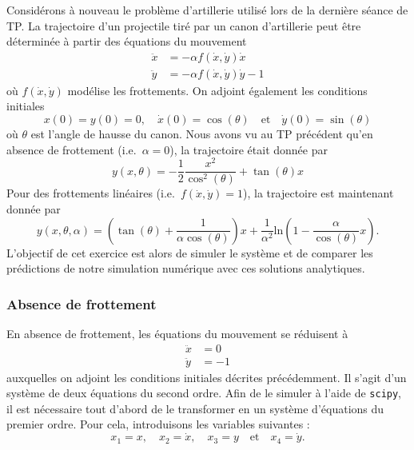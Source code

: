\documentclass[a4paper,12pt]{article} %
\begin{document}
Considérons à nouveau le problème d'artillerie utilisé lors de la dernière séance de TP.
La trajectoire d'un projectile tiré par un canon d'artillerie peut être déterminée à partir des équations du mouvement
%
\[
\begin{aligned}
  \ddot{x} & = -\alpha f(\dot{x}, \dot{y})\dot{x}\\
  \ddot{y} & = -\alpha f(\dot{x}, \dot{y}) \dot{y} - 1
\end{aligned}
\]
%
où $f(\dot{x}, \dot{y})$ modélise les frottements.
On adjoint également les conditions initiales
%
\[
x(0) = y(0) = 0, \quad \dot{x}(0) = \cos(\theta) \quad \text{et} \quad \dot{y}(0) = \sin(\theta)
\]
%
où $\theta$ est l'angle de hausse du canon.
Nous avons vu au TP précédent qu'en absence de frottement (i.e.\ $\alpha = 0$), la trajectoire était donnée par
%
\[
y(x, \theta) = -\dfrac{1}{2} \dfrac{x^2}{\cos^2(\theta)} + \tan(\theta)x
\]
%
Pour des frottements linéaires (i.e.\ $f(\dot{x}, \dot{y}) = 1$), la trajectoire est maintenant donnée par
%
\[
y(x, \theta, \alpha) = \left( \tan(\theta) + \dfrac{1}{\alpha \cos(\theta)} \right) x + \dfrac{1}{\alpha^2} \mathrm{ln} \left( 1 - \dfrac{\alpha}{\cos(\theta)}x \right).
\]
%
L'objectif de cet exercice est alors de simuler le système et de comparer les prédictions de notre simulation numérique avec ces solutions analytiques.

\subsubsection*{Absence de frottement}

En absence de frottement, les équations du mouvement se réduisent à
%
\[
\begin{aligned}
  \ddot{x} & = 0 \\
  \ddot{y} & = -1
\end{aligned}
\]
%
auxquelles on adjoint les conditions initiales décrites précédemment.
Il s'agit d'un système de deux équations du second ordre.
Afin de le simuler à l'aide de \verb+scipy+, il est nécessaire tout d'abord de le transformer en un système d'équations du premier ordre.
Pour cela, introduisons les variables suivantes :
%
\[
x_1 = x, \quad x_2 = \dot{x}, \quad x_3 = y \quad \text{et} \quad x_4 = \dot{y}.
\]
\end{document}
